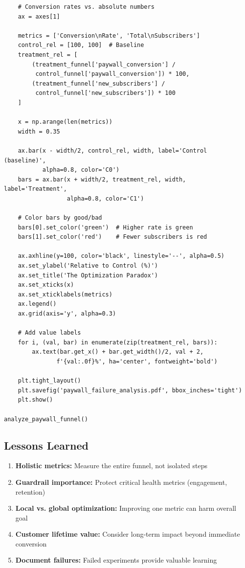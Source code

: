 \begin{lstlisting}
    # Conversion rates vs. absolute numbers
    ax = axes[1]

    metrics = ['Conversion\nRate', 'Total\nSubscribers']
    control_rel = [100, 100]  # Baseline
    treatment_rel = [
        (treatment_funnel['paywall_conversion'] /
         control_funnel['paywall_conversion']) * 100,
        (treatment_funnel['new_subscribers'] /
         control_funnel['new_subscribers']) * 100
    ]

    x = np.arange(len(metrics))
    width = 0.35

    ax.bar(x - width/2, control_rel, width, label='Control (baseline)',
           alpha=0.8, color='C0')
    bars = ax.bar(x + width/2, treatment_rel, width, label='Treatment',
                  alpha=0.8, color='C1')

    # Color bars by good/bad
    bars[0].set_color('green')  # Higher rate is green
    bars[1].set_color('red')    # Fewer subscribers is red

    ax.axhline(y=100, color='black', linestyle='--', alpha=0.5)
    ax.set_ylabel('Relative to Control (%)')
    ax.set_title('The Optimization Paradox')
    ax.set_xticks(x)
    ax.set_xticklabels(metrics)
    ax.legend()
    ax.grid(axis='y', alpha=0.3)

    # Add value labels
    for i, (val, bar) in enumerate(zip(treatment_rel, bars)):
        ax.text(bar.get_x() + bar.get_width()/2, val + 2,
               f'{val:.0f}%', ha='center', fontweight='bold')

    plt.tight_layout()
    plt.savefig('paywall_failure_analysis.pdf', bbox_inches='tight')
    plt.show()

analyze_paywall_funnel()
\end{lstlisting}

\subsection{Lessons Learned}

\begin{enumerate}
    \item \textbf{Holistic metrics:} Measure the entire funnel, not isolated steps

    \item \textbf{Guardrail importance:} Protect critical health metrics (engagement, retention)

    \item \textbf{Local vs. global optimization:} Improving one metric can harm overall goal

    \item \textbf{Customer lifetime value:} Consider long-term impact beyond immediate conversion

    \item \textbf{Document failures:} Failed experiments provide valuable learning
\end{enumerate}

